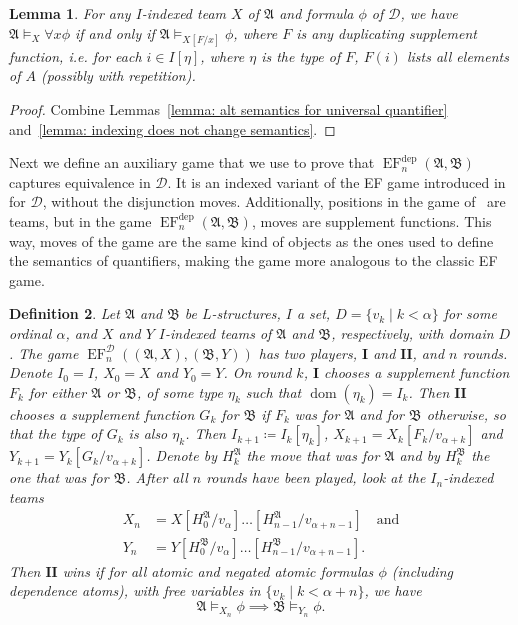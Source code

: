 \documentclass[10pt,a4paper]{amsart}
\newtheorem{definition}{Definition}[section]
\newtheorem{lemma}[definition]{Lemma}
\newcommand{\playerone}{\mathrm{\mathbf{I}}}
\newcommand{\playertwo}{\mathrm{\mathbf{II}}}
\DeclareMathOperator{\EF}{EF}
\newcommand{\EFdep}{\EF^{\mathrm{dep}}}
\newcommand{\A}{\mathfrak{A}}
\newcommand{\B}{\mathfrak{B}}
\newcommand{\deplog}{\mathcal D}
\DeclareMathOperator{\dom}{dom}
\begin{document}
\begin{lemma}
    For any $I$-indexed team $X$ of $\A$ and formula $\phi$ of $\deplog$, we have $\A\models_X\forall x\phi$ if and only if $\A\models_{X[F/x]}\phi$, where $F$ is any duplicating supplement function, i.e. for each $i\in I[\eta]$, where $\eta$ is the type of $F$, $F(i)$ lists all elements of $A$ (possibly with repetition).
\end{lemma}
\begin{proof}
    Combine Lemmas~\ref{lemma: alt semantics for universal quantifier} and~\ref{lemma: indexing does not change semantics}.
\end{proof}

Next we define an auxiliary game that we use to prove that $\EFdep_n(\A,\B)$ captures equivalence in $\deplog$. It is an indexed variant of the EF game introduced in~\cite{MR2351449} for $\deplog$, without the disjunction moves.
Additionally, positions in the game of~\cite{MR2351449} are teams, but in the game $\EFdep_n(\A,\B)$, moves are supplement functions. This way, moves of the game are the same kind of objects as the ones used to define the semantics of quantifiers, making the game more analogous to the classic EF game.

\begin{definition}
    Let $\A$ and $\B$ be $L$-structures, $I$ a set, $D = \{v_k \mid k<\alpha\}$ for some ordinal $\alpha$, and $X$ and $Y$ $I$-indexed teams of $\A$ and $\B$, respectively, with domain $D$. The game $\EF^\deplog_n((\A,X),(\B,Y))$ has two players, $\playerone$ and $\playertwo$, and $n$ rounds. Denote $I_0 = I$, $X_0 = X$ and $Y_0 = Y$. On round $k$, $\playerone$ chooses a supplement function $F_k$ for either $\A$ or $\B$, of some type $\eta_k$ such that $\dom(\eta_k) = I_k$. Then $\playertwo$ chooses a supplement function $G_k$ for $\B$ if $F_k$ was for $\A$ and for $\B$ otherwise, so that the type of $G_k$ is also $\eta_k$. Then $I_{k+1} \coloneqq I_k[\eta_k]$, $X_{k+1} = X_k[F_k/v_{\alpha+k}]$ and $Y_{k+1} = Y_k[G_k/v_{\alpha+k}]$. Denote by $H_k^\A$ the move that was for $\A$ and by $H_k^\B$ the one that was for $\B$. After all $n$ rounds have been played, look at the $I_n$-indexed teams
    \begin{align*}
        X_n &= X[H^\A_0/v_\alpha]\dots[H^\A_{n-1}/v_{\alpha+n-1}] \quad\text{and} \\
        Y_n &= Y[H^\B_0/v_\alpha]\dots[H^\B_{n-1}/v_{\alpha+n-1}].
    \end{align*}
    Then $\playertwo$ wins if for all atomic and negated atomic formulas $\phi$ (including dependence atoms), with free variables in $\{v_k \mid k<\alpha+n\}$, we have
    \[
        \A\models_{X_n}\phi \implies \B\models_{Y_n}\phi.
    \]
\end{definition}
\end{document}
